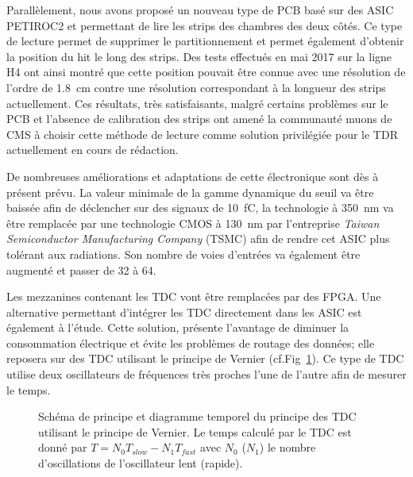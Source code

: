 Parallèlement, nous avons proposé un nouveau type de PCB basé sur des ASIC PETIROC2 et permettant de lire les strips des chambres des deux côtés. Ce type de lecture permet de supprimer le partitionnement et permet également d'obtenir la position du hit le long des strips. Des tests effectués en mai \num{2017} sur la ligne H4 ont ainsi montré que cette position pouvait être connue avec une résolution de l'ordre de \SI{1.8}{\centi\meter} contre une résolution correspondant à la longueur des strips actuellement. Ces résultats, très satisfaisants, malgré certains problèmes sur le PCB et l'absence de calibration des strips ont amené la communauté muons de CMS à choisir cette méthode de lecture comme solution privilégiée pour le TDR actuellement en cours de rédaction.

De nombreuses améliorations et adaptations de cette électronique sont dès à présent prévu. La valeur minimale de la gamme dynamique du seuil va être baissée afin de déclencher sur des signaux de \SI{10}{\femto\coulomb}, la technologie  à \SI{350}{\nano\meter} va être remplacée par une technologie CMOS à \SI{130}{\nano\meter} par l'entreprise \textit{Taiwan Semiconductor Manufacturing Company} (TSMC) afin de rendre cet ASIC plus tolérant aux radiations. Son nombre de voies d'entrées va également être augmenté et passer de \num{32} à \num{64}.

Les mezzanines contenant les TDC vont être remplacées par des FPGA. Une alternative permettant d'intégrer les TDC directement dans les ASIC est également à l'étude. Cette solution, présente l'avantage de diminuer la consommation électrique et évite les problèmes de routage des données; elle reposera sur des TDC utilisant le principe de Vernier (cf.Fig~\ref{vernier}). Ce type de TDC utilise deux oscillateurs de fréquences très proches l'une de l'autre afin de mesurer le temps.

\begin{figure}[ht!]
	\centering
	\hfill
	\caption{Schéma de principe et diagramme temporel du principe des TDC utilisant le principe de Vernier. Le temps calculé par le TDC est donné par $T=N_0T_{slow}-N_1T_{fast}$ avec $N_0$ ($N_1$) le nombre d'oscillations de l'oscillateur lent (rapide).}
	\label{vernier}
\end{figure}

